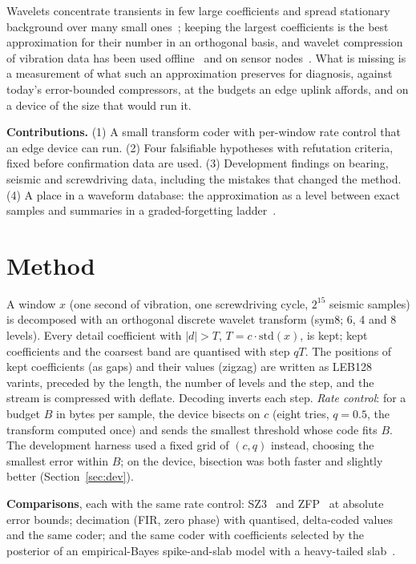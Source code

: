 \documentclass[sigconf,nonacm]{acmart}
\begin{document}
Wavelets concentrate transients in few large coefficients and spread stationary background over many small ones~\cite{mallat2009,daubechies1992}; keeping the largest coefficients is the best approximation for their number in an orthogonal basis, and wavelet compression of vibration data has been used offline~\cite{staszewski1998} and on sensor nodes~\cite{xu2004}. What is missing is a measurement of what such an approximation preserves for diagnosis, against today's error-bounded compressors, at the budgets an edge uplink affords, and on a device of the size that would run it.

\textbf{Contributions.} (1) A small transform coder with per-window rate control that an edge device can run. (2) Four falsifiable hypotheses with refutation criteria, fixed before confirmation data are used. (3) Development findings on bearing, seismic and screwdriving data, including the mistakes that changed the method. (4) A place in a waveform database: the approximation as a level between exact samples and summaries in a graded-forgetting ladder~\cite{paper2}.

\section{Method}\label{sec:method}
A window $x$ (one second of vibration, one screwdriving cycle, $2^{15}$ seismic samples) is decomposed with an orthogonal discrete wavelet transform (sym8; 6, 4 and 8 levels). Every detail coefficient with $|d| > T$, $T = c\cdot\mathrm{std}(x)$, is kept; kept coefficients and the coarsest band are quantised with step $qT$. The positions of kept coefficients (as gaps) and their values (zigzag) are written as LEB128 varints, preceded by the length, the number of levels and the step, and the stream is compressed with deflate. Decoding inverts each step. \emph{Rate control}: for a budget $B$ in bytes per sample, the device bisects on $c$ (eight tries, $q = 0.5$, the transform computed once) and sends the smallest threshold whose code fits $B$. The development harness used a fixed grid of $(c,q)$ instead, choosing the smallest error within $B$; on the device, bisection was both faster and slightly better (Section~\ref{sec:dev}).

\textbf{Comparisons}, each with the same rate control: SZ3~\cite{liang2023} and ZFP~\cite{lindstrom2014} at absolute error bounds; decimation (FIR, zero phase) with quantised, delta-coded values and the same coder; and the same coder with coefficients selected by the posterior of an empirical-Bayes spike-and-slab model with a heavy-tailed slab~\cite{abramovich1998,johnstone2004,rivoirard2004}.
\end{document}
